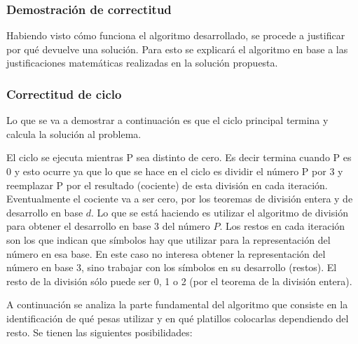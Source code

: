 	\subsubsection{Demostración de correctitud}

	Habiendo visto cómo funciona el algoritmo desarrollado, se procede a
	justificar por qué devuelve una solución. Para esto se explicará el algoritmo en base a las justificaciones matemáticas realizadas en la solución propuesta.
	\subsubsection*{Correctitud de ciclo}

	Lo que se va a demostrar a continuación es que el ciclo principal termina y calcula la solución al problema.

	El ciclo se ejecuta mientras P sea distinto de cero. Es decir termina cuando P es 0 y esto ocurre ya que lo que se hace en el ciclo es dividir el número P por 3 y reemplazar P por el resultado (cociente) de esta división en cada iteración. Eventualmente el cociente va a ser cero, por los teoremas de división entera y de desarrollo en base $d$. Lo que se está haciendo es utilizar el algoritmo de división para obtener el desarrollo en base 3 del número $P$. Los restos en cada iteración son los que indican que símbolos hay que utilizar para la representación del número en esa base. En este caso no interesa obtener la representación del número en base 3, sino trabajar con los símbolos en su desarrollo (restos). El resto de la división sólo puede ser 0, 1 o 2 (por el teorema de la división entera).

	A continuación se analiza la parte fundamental del algoritmo que consiste en la identificación de qué pesas utilizar y en qué platillos colocarlas dependiendo del resto. Se tienen las siguientes posibilidades: 

